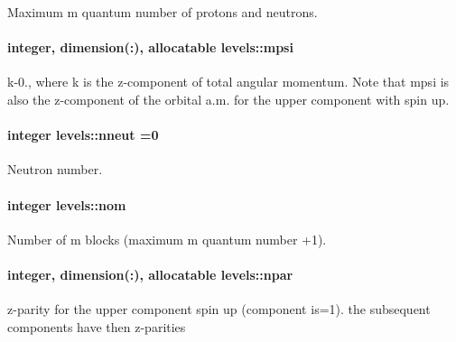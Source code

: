 Maximum m quantum number of protons and neutrons. 

\paragraph[{\texorpdfstring{mpsi}{mpsi}}]{\setlength{\rightskip}{0pt plus 5cm}integer, dimension(\+:), allocatable levels\+::mpsi}\hypertarget{namespacelevels_a465336b1dc5b723d1f54fb7361d8ed38}{}\label{namespacelevels_a465336b1dc5b723d1f54fb7361d8ed38}


k-\/0., where k is the z-\/component of total angular momentum. Note that mpsi is also the z-\/component of the orbital a.\+m. for the upper component with spin up. 

\paragraph[{\texorpdfstring{nneut}{nneut}}]{\setlength{\rightskip}{0pt plus 5cm}integer levels\+::nneut =0}\hypertarget{namespacelevels_aa35279701a4ecc295c042671aa8ecceb}{}\label{namespacelevels_aa35279701a4ecc295c042671aa8ecceb}


Neutron number. 

\paragraph[{\texorpdfstring{nom}{nom}}]{\setlength{\rightskip}{0pt plus 5cm}integer levels\+::nom}\hypertarget{namespacelevels_af99762eb2e2686cee88093daddf503c0}{}\label{namespacelevels_af99762eb2e2686cee88093daddf503c0}


Number of m blocks (maximum m quantum number +1). 

\paragraph[{\texorpdfstring{npar}{npar}}]{\setlength{\rightskip}{0pt plus 5cm}integer, dimension(\+:), allocatable levels\+::npar}\hypertarget{namespacelevels_a452a8212f6b718ac0f5e0809ca874e67}{}\label{namespacelevels_a452a8212f6b718ac0f5e0809ca874e67}


z-\/parity for the upper component spin up (component {\ttfamily is=1}). the subsequent components have then z-\/parities 


